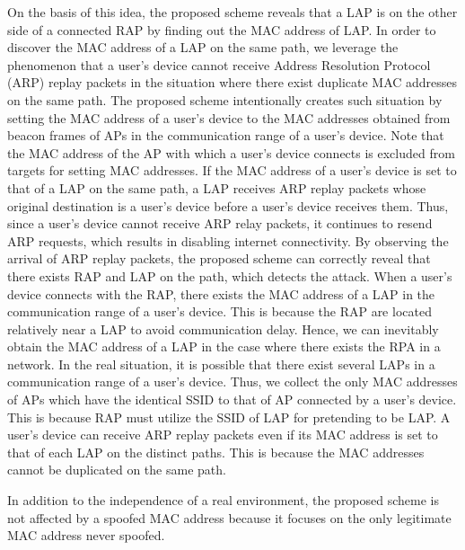\documentclass[conference]{IEEEtran}
\begin{document}
On the basis of this idea, the proposed scheme reveals that a LAP is on the other side of a connected RAP by finding out the MAC address of LAP.
In order to discover the MAC address of a LAP on the same path, we leverage the phenomenon that a user's device cannot receive Address Resolution Protocol (ARP) replay packets in the situation where there exist duplicate MAC addresses on the same path.
The proposed scheme intentionally creates such situation by setting the MAC address of a user's device to the MAC addresses obtained from beacon frames of APs in the communication range of a user's device.
Note that the MAC address of the AP with which a user's device connects is excluded from targets for setting MAC addresses.
If the MAC address of a user's device is set to that of a LAP on the same path, a LAP receives ARP replay packets whose original destination is a user's device before a user's device receives them.
Thus, since a user's device cannot receive ARP relay packets, it continues to resend ARP requests, which results in disabling internet connectivity.
By observing the arrival of ARP replay packets, the proposed scheme can correctly reveal that there exists RAP and LAP on the path, which detects the attack.
When a user's device connects with the RAP, there exists the MAC address of a LAP in the communication range of a user's device.
This is because the RAP are located relatively near a LAP to avoid communication delay.
Hence, we can inevitably obtain the MAC address of a LAP in the case where there exists the RPA in a network.
In the real situation, it is possible that there exist several LAPs in a communication range of a user's device.
Thus, we collect the only MAC addresses of APs which have the identical SSID to that of AP connected by a user's device.
This is because RAP must utilize the SSID of LAP for pretending to be LAP.
A user's device can receive ARP replay packets even if its MAC address is set to that of each LAP on the distinct paths.
This is because the MAC addresses cannot be duplicated on the same path.

In addition to the independence of a real environment, the proposed scheme is not affected by a spoofed MAC address because it focuses on the only legitimate MAC address never spoofed.
\end{document}

